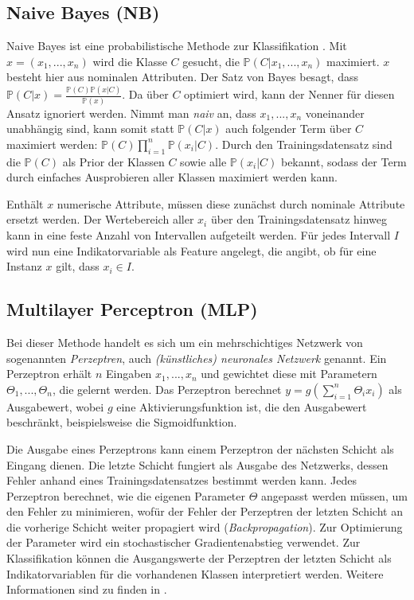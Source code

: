 \subsection{Naive Bayes (NB)}
Naive Bayes ist eine probabilistische Methode zur Klassifikation \cite{John1995}. Mit $x = (x_1, ..., x_n)$ wird die Klasse $C$ gesucht, die $\mathbb{P}(C | x_1, ..., x_n)$ maximiert. $x$ besteht hier aus nominalen Attributen. Der Satz von Bayes besagt, dass $\mathbb{P}(C|x) = \frac{\mathbb{P}(C) \mathbb{P}(x | C)}{\mathbb{P}(x)}$. Da über $C$ optimiert wird, kann der Nenner für diesen Ansatz ignoriert werden. Nimmt man \textit{naiv} an, dass $x_1, ..., x_n$ voneinander unabhängig sind, kann somit statt $\mathbb{P}(C | x)$ auch folgender Term über $C$ maximiert werden: $\mathbb{P}(C) \prod_{i=1}^{n} \mathbb{P}(x_i | C)$. Durch den Trainingsdatensatz sind die $\mathbb{P}(C)$ als Prior der Klassen $C$ sowie alle $\mathbb{P}(x_i | C)$ bekannt, sodass der Term durch einfaches Ausprobieren aller Klassen maximiert werden kann.

Enthält $x$ numerische Attribute, müssen diese zunächst durch nominale Attribute ersetzt werden. Der Wertebereich aller $x_i$ über den Trainingsdatensatz hinweg kann in eine feste Anzahl von Intervallen aufgeteilt werden. Für jedes Intervall $I$ wird nun eine Indikatorvariable als Feature angelegt, die angibt, ob für eine Instanz $x$ gilt, dass $x_i \in I$.
\subsection{Multilayer Perceptron (MLP)}
Bei dieser Methode handelt es sich um ein mehrschichtiges Netzwerk von sogenannten \textit{Perzeptren}, auch \textit{(künstliches) neuronales Netzwerk} genannt. Ein Perzeptron erhält $n$ Eingaben $x_1, ..., x_n$ und gewichtet diese mit Parametern $\Theta_1, ..., \Theta_n$, die gelernt werden. Das Perzeptron berechnet $y = g(\sum_{i=1}^{n} \Theta_i x_i)$ als Ausgabewert, wobei $g$ eine Aktivierungsfunktion ist, die den Ausgabewert beschränkt, beispielsweise die Sigmoidfunktion.

Die Ausgabe eines Perzeptrons kann einem Perzeptron der nächsten Schicht als Eingang dienen. Die letzte Schicht fungiert als Ausgabe des Netzwerks, dessen Fehler anhand eines Trainingsdatensatzes bestimmt werden kann. Jedes Perzeptron berechnet, wie die eigenen Parameter $\Theta$ angepasst werden müssen, um den Fehler zu minimieren, wofür der Fehler der Perzeptren der letzten Schicht an die vorherige Schicht weiter propagiert wird (\textit{Backpropagation}). Zur Optimierung der Parameter wird ein stochastischer Gradientenabstieg verwendet. Zur Klassifikation können die Ausgangswerte der Perzeptren der letzten Schicht als Indikatorvariablen für die vorhandenen Klassen interpretiert werden. Weitere Informationen sind zu finden in \cite{Haykin1994}.